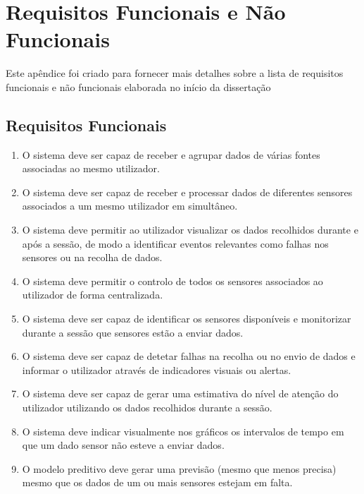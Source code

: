 \chapter{Requisitos Funcionais e Não Funcionais}
\label{chap:appendix-requirements}

\begin{introduction}
Este apêndice foi criado para fornecer mais detalhes sobre a lista de requisitos funcionais e não funcionais elaborada no início da dissertação
\end{introduction}

\section{Requisitos Funcionais}

\begin{enumerate}
    \item[FR1] O sistema deve ser capaz de receber e agrupar dados de várias fontes associadas ao mesmo utilizador.
    \item[FR2] O sistema deve ser capaz de receber e processar dados de diferentes sensores associados a um mesmo utilizador em simultâneo.
    \item[FR3] O sistema deve permitir ao utilizador visualizar os dados recolhidos durante e após a sessão, de modo a identificar eventos relevantes como falhas nos sensores ou na recolha de dados.
    \item[FR4] O sistema deve permitir o controlo de todos os sensores associados ao utilizador de forma centralizada.
    \item[FR5] O sistema deve ser capaz de identificar os sensores disponíveis e monitorizar durante a sessão que sensores estão a enviar dados.
    \item[FR6] O sistema deve ser capaz de detetar falhas na recolha ou no envio de dados e informar o utilizador através de indicadores visuais ou alertas.
    \item[FR7] O sistema deve ser capaz de gerar uma estimativa do nível de atenção do utilizador utilizando os dados recolhidos durante a sessão.
    \item[FR8] O sistema deve indicar visualmente nos gráficos os intervalos de tempo em que um dado sensor não esteve a enviar dados.
    \item[FR9] O modelo preditivo deve gerar uma previsão (mesmo que menos precisa) mesmo que os dados de um ou mais sensores estejam em falta.
\end{enumerate}

